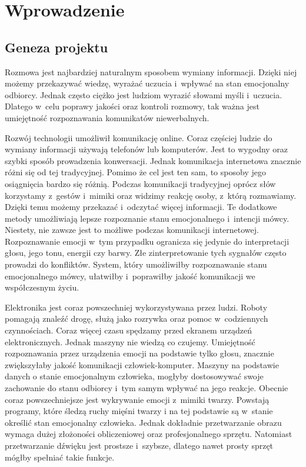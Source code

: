 \documentclass[declaration,shortabstract]{iithesis}
\author         {Elżbieta Plaszczyk}
\begin{document}
\let\cleardoublepage\clearpage
\chapter{Wprowadzenie}
\section{Geneza projektu}
Rozmowa jest najbardziej naturalnym sposobem wymiany informacji. Dzięki niej możemy przekazywać wiedzę, wyrażać uczucia i~wpływać na stan emocjonalny odbiorcy.  Jednak często ciężko jest ludziom wyrazić słowami myśli i~uczucia. Dlatego w~celu poprawy jakości oraz kontroli rozmowy, tak ważna jest umiejętność rozpoznawania komunikatów niewerbalnych. 

Rozwój technologii umożliwił komunikację online. Coraz częściej ludzie do wymiany informacji używają telefonów lub komputerów. Jest to wygodny oraz szybki sposób prowadzenia konwersacji. Jednak komunikacja internetowa znacznie różni się od tej tradycyjnej. Pomimo że cel jest ten sam, to sposoby jego osiągnięcia bardzo się różnią. Podczas komunikacji tradycyjnej oprócz słów korzystamy z~gestów i~mimiki oraz widzimy reakcję osoby, z~którą rozmawiamy. Dzięki temu możemy przekazać i~odczytać więcej informacji. Te dodatkowe metody umożliwiają lepsze rozpoznanie stanu emocjonalnego i~intencji mówcy. Niestety, nie zawsze jest to możliwe podczas komunikacji internetowej. Rozpoznawanie emocji w~tym przypadku ogranicza się jedynie do interpretacji głosu, jego tonu, energii czy barwy. Złe zinterpretowanie tych sygnałów często prowadzi do konfliktów. System, który umożliwiłby rozpoznawanie stanu emocjonalnego mówcy, ułatwiłby i~poprawiłby jakość komunikacji we współczesnym życiu. 

Elektronika jest coraz powszechniej wykorzystywana przez ludzi. Roboty pomagają znaleźć drogę, służą jako rozrywka oraz pomoc w~codziennych czynnościach. Coraz więcej czasu spędzamy przed ekranem urządzeń elektronicznych. Jednak maszyny nie wiedzą co czujemy. Umiejętność rozpoznawania przez urządzenia emocji na podstawie tylko głosu, znacznie zwiększyłaby jakość komunikacji człowiek-komputer. Maszyny na podstawie danych o stanie emocjonalnym człowieka, mogłyby dostosowywać swoje zachowanie do stanu odbiorcy i~tym samym wpływać na jego reakcje. Obecnie coraz powszechniejsze jest wykrywanie emocji z~mimiki twarzy. Powstają programy, które śledzą ruchy mięśni twarzy i na tej podstawie są w~stanie określić stan emocjonalny człowieka. Jednak dokładnie przetwarzanie obrazu wymaga dużej złożoności obliczeniowej oraz profesjonalnego sprzętu. Natomiast przetwarzanie dźwięku jest prostsze i~szybsze, dlatego nawet prosty sprzęt mógłby spełniać takie funkcje.
\end{document}
